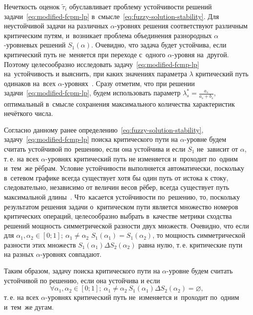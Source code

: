 Нечеткость оценок $\tilde{\tau}_i$ обуславливает проблему устойчивости решений задачи~\eqref{eq:modified-fcpm-lp} в~смысле~\eqref{eq:fuzzy-solution-stability}. Для неустойчивой задачи на различных $\alpha $-уровнях решения соответствуют различным критическим путям, и~возникает проблема объединения разнородных $\alpha$-уровневых решений $S_1\left(\alpha \right)$. Очевидно, что задача будет устойчива, если критический путь не~меняется при переходе с~одного $\alpha$-уровня на~другой. Поэтому целесообразно исследовать задачу~\eqref{eq:modified-fcmp-lp} на~устойчивость и выяснить, при каких значениях параметра $\lambda$ критический путь одинаков на~всех $\alpha$-уровнях~\cite{Vorontsov_VSTU}. Сразу отметим, что при решении задачи~\eqref{eq:modified-fcpm-lp}, будем использовать параметр $\displaystyle \lambda_{s}^{*}=\frac{a_s}{a_s+b_s}$, оптимальный в~смысле сохранения максимального количества характеристик нечёткого числа.

Согласно данному ранее определению~\eqref{eq:fuzzy-solution-stability}, задачу~\eqref{eq:modified-fcmp-lp} поиска критического пути на $\alpha$-уровне будем считать устойчивой по~решению, если она устойчива и если $S_1$ не~зависит от $\alpha$, т.\,е. на всех $\alpha$-уровнях критический путь не изменяется и~проходит по~одним и~тем~же рёбрам. Условие устойчивости выполняется автоматически, поскольку в~сетевом графике всегда существует хотя бы один путь от истока к стоку, следовательно, независимо от величин весов рёбер, всегда существует путь максимальной длины~\cite{Kormen}. Что~касается устойчивости по~решению, то, поскольку результатом решения задачи о~критическом пути является множество номеров критических операций, целесообразно выбрать в~качестве метрики сходства решений мощность симметрической разности двух множеств. Очевидно, что если для $\alpha_1, \alpha_2 \in \left[ 0;1 \right];\ \alpha_1\ne \alpha_2$ $S_1\left( \alpha_1 \right)=S_1\left(\alpha_2 \right)$, то мощность симметрической разности этих множеств $S_1\left( \alpha_1 \right)\Delta S_2\left(\alpha_2 \right)$ равна нулю, т.\,е. критические пути на разных $\alpha$-уровнях совпадают.

Таким образом, задачу поиска критического пути на $\alpha $-уровне будем считать устойчивой по решению, если она устойчива и если 
\begin{equation}
\label{eq:modified-cpm-lp-stability}
  \forall \alpha_1, \alpha_2\in \left[ 0;1 \right];\ \alpha_1\ne \alpha_2\ S_1\left(\alpha_1 \right)\Delta S_2\left(\alpha_2 \right)=\varnothing,
\end{equation}
т.\,е. на всех $\alpha $-уровнях критический путь не~изменяется и~проходит по~одним и~тем~же дугам. 

